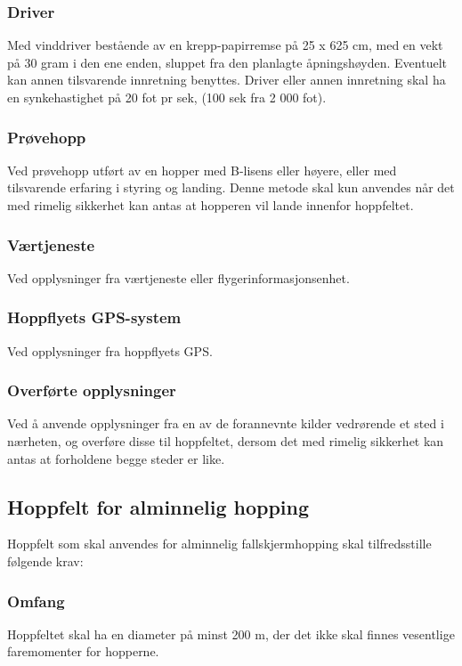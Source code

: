 \subsubsection{Driver}
Med vinddriver bestående av en krepp-papirremse på 25 x 625 cm, med en vekt på 30 gram i den ene enden, sluppet fra den planlagte åpningshøyden. Eventuelt kan annen tilsvarende innretning benyttes. Driver eller annen innretning skal ha en synkehastighet på 20 fot pr sek, (100 sek fra 2 000 fot).

\subsubsection{Prøvehopp}
Ved prøvehopp utført av en hopper med B-lisens eller høyere, eller med tilsvarende erfaring i styring og landing. Denne metode skal kun anvendes når det med rimelig sikkerhet kan antas at hopperen vil lande innenfor hoppfeltet.

\subsubsection{Værtjeneste}
Ved opplysninger fra værtjeneste eller flygerinformasjonsenhet.

\subsubsection{Hoppflyets GPS-system}
Ved opplysninger fra hoppflyets GPS.

\subsubsection{Overførte opplysninger}
Ved å anvende opplysninger fra en av de forannevnte kilder vedrørende et sted i nærheten, og overføre disse til hoppfeltet, dersom det med rimelig sikkerhet kan antas at forholdene begge steder er like.

\subsection{Hoppfelt for alminnelig hopping}
Hoppfelt som skal anvendes for alminnelig fallskjermhopping skal tilfredsstille følgende krav:

\subsubsection{Omfang}
Hoppfeltet skal ha en diameter på minst 200 m, der det ikke skal finnes vesentlige faremomenter for hopperne.

